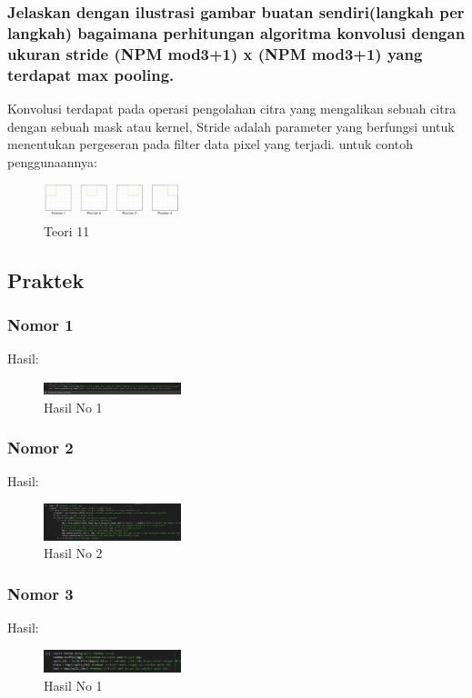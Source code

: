 \subsubsection{Jelaskan dengan ilustrasi gambar buatan sendiri(langkah per langkah) bagaimana perhitungan algoritma konvolusi dengan ukuran stride (NPM mod3+1) x (NPM mod3+1) yang terdapat max pooling.}	
\hfill\break
Konvolusi terdapat pada operasi pengolahan citra yang mengalikan sebuah citra dengan sebuah mask atau kernel, Stride adalah parameter yang berfungsi untuk menentukan pergeseran pada filter data pixel yang terjadi. untuk contoh penggunaannya:
\begin{figure}[H]
\centering
	\includegraphics[width=4cm]{figures/1174067/7/11.jpg}
\caption{Teori 11}
\end{figure}



\subsection{Praktek}
\subsubsection{Nomor 1}
\hfill\break

Hasil:
\begin{figure}[H]
\centering
	\includegraphics[width=4cm]{figures/1174067/7/no1.jpg}
	\caption{Hasil No 1}
\end{figure}

\subsubsection{Nomor 2}
\hfill\break

Hasil:
\begin{figure}[H]
\centering
	\includegraphics[width=4cm]{figures/1174067/7/no2.jpg}
	\caption{Hasil No 2}
\end{figure}

\subsubsection{Nomor 3}
\hfill\break

Hasil:
\begin{figure}[H]
\centering
	\includegraphics[width=4cm]{figures/1174067/7/no3.jpg}
	\caption{Hasil No 1}
\end{figure}

